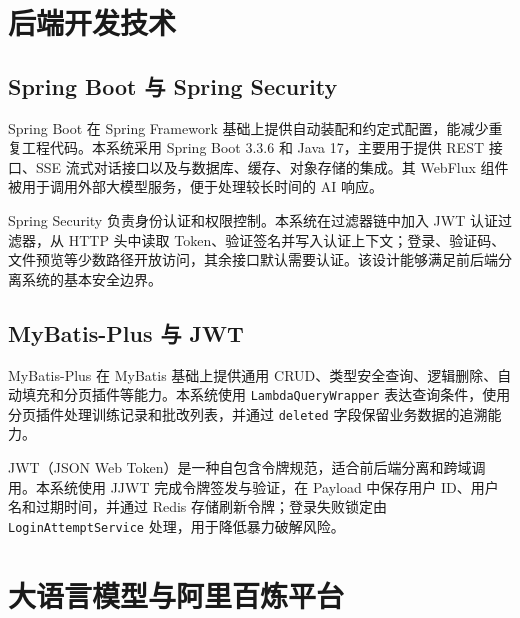 \section{后端开发技术}

\subsection{Spring Boot 与 Spring Security}

Spring Boot 在 Spring Framework 基础上提供自动装配和约定式配置，能减少重复工程代码\cite{springboot2024}。本系统采用 Spring Boot 3.3.6 和 Java 17，主要用于提供 REST 接口、SSE 流式对话接口以及与数据库、缓存、对象存储的集成。其 WebFlux 组件被用于调用外部大模型服务，便于处理较长时间的 AI 响应。

Spring Security 负责身份认证和权限控制。本系统在过滤器链中加入 JWT 认证过滤器，从 HTTP 头中读取 Token、验证签名并写入认证上下文；登录、验证码、文件预览等少数路径开放访问，其余接口默认需要认证。该设计能够满足前后端分离系统的基本安全边界。

\subsection{MyBatis-Plus 与 JWT}

MyBatis-Plus 在 MyBatis 基础上提供通用 CRUD、类型安全查询、逻辑删除、自动填充和分页插件等能力\cite{mybatisplus2024}。本系统使用 \texttt{LambdaQueryWrapper} 表达查询条件，使用分页插件处理训练记录和批改列表，并通过 \texttt{deleted} 字段保留业务数据的追溯能力。

JWT（JSON Web Token）是一种自包含令牌规范\cite{jones2015jwt}，适合前后端分离和跨域调用。本系统使用 JJWT 完成令牌签发与验证，在 Payload 中保存用户 ID、用户名和过期时间，并通过 Redis 存储刷新令牌；登录失败锁定由 \texttt{LoginAttemptService} 处理，用于降低暴力破解风险。

\section{大语言模型与阿里百炼平台}

